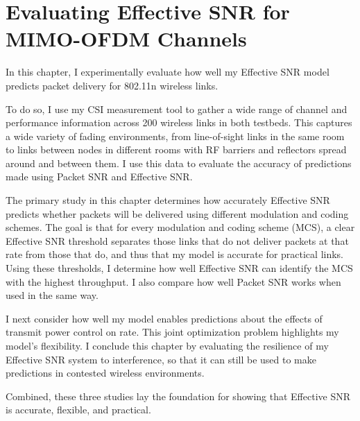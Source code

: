 \ifx\mainfile\undefined

\setcounter{chapter}{5} %
\fi

\cleardoublepage
\chapter{Evaluating Effective SNR for MIMO-OFDM Channels}
\label{chap:delivery}

In this chapter, I experimentally evaluate how well my Effective SNR model predicts packet delivery for 802.11n wireless links. %

To do so, I use my CSI measurement tool to gather a wide range of channel and performance information across 200 wireless links in both testbeds. This captures a wide variety of fading environments, from line-of-sight links in the same room to links between nodes in different rooms with RF barriers and reflectors spread around and between them. I use this data to evaluate the accuracy of predictions made using Packet SNR and Effective SNR.

The primary study in this chapter determines how accurately Effective SNR predicts whether packets will be delivered using different modulation and coding schemes. The goal is that for every modulation and coding scheme (MCS), a clear Effective SNR threshold separates those links that do not deliver packets at that rate from those that do, and thus that my model is accurate for practical links. Using these thresholds, I determine how well Effective SNR can identify the MCS with the highest throughput. I also compare how well Packet SNR works when used in the same way.

I next consider how well my model enables predictions about the effects of transmit power control on rate. This joint optimization problem highlights my model's flexibility. I conclude this chapter by evaluating the resilience of my Effective SNR system to interference, so that it can still be used to make predictions in contested wireless environments.

Combined, these three studies lay the foundation for showing that Effective SNR is accurate, flexible, and practical.

